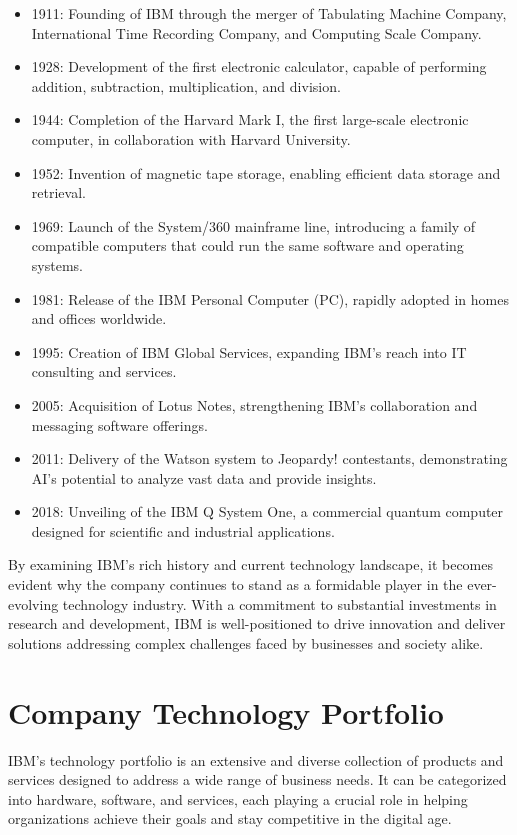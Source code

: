 \begin{itemize}
  \item 1911: Founding of IBM through the merger of Tabulating Machine Company, International Time Recording Company, and Computing Scale Company.
  \item 1928: Development of the first electronic calculator, capable of performing addition, subtraction, multiplication, and division.
  \item 1944: Completion of the Harvard Mark I, the first large-scale electronic computer, in collaboration with Harvard University.
  \item 1952: Invention of magnetic tape storage, enabling efficient data storage and retrieval.
  \item 1969: Launch of the System/360 mainframe line, introducing a family of compatible computers that could run the same software and operating systems.
  \item 1981: Release of the IBM Personal Computer (PC), rapidly adopted in homes and offices worldwide.
  \item 1995: Creation of IBM Global Services, expanding IBM's reach into IT consulting and services.
  \item 2005: Acquisition of Lotus Notes, strengthening IBM's collaboration and messaging software offerings.
  \item 2011: Delivery of the Watson system to Jeopardy! contestants, demonstrating AI's potential to analyze vast data and provide insights.
  \item 2018: Unveiling of the IBM Q System One, a commercial quantum computer designed for scientific and industrial applications.
\end{itemize}

By examining IBM's rich history and current technology landscape, it becomes evident why the company continues to stand as a formidable player in the ever-evolving technology industry. With a commitment to substantial investments in research and development, IBM is well-positioned to drive innovation and deliver solutions addressing complex challenges faced by businesses and society alike.

\section{Company Technology Portfolio}
IBM's technology portfolio is an extensive and diverse collection of products and services designed to address a wide range of business needs. It can be categorized into hardware, software, and services, each playing a crucial role in helping organizations achieve their goals and stay competitive in the digital age.

